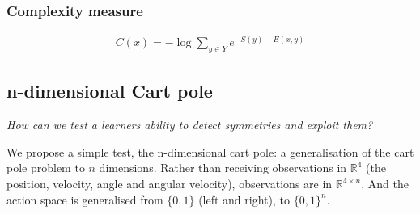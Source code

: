 \subsubsection{Complexity measure}

\begin{align*}
C(x) = -\log \sum_{y\in Y} e^{-S(y) - E(x, y)}
\end{align*}



%
%
%
%
%
%

\subsection{n-dimensional Cart pole}\label{action-space-experiments}

\begin{displayquote}
  \textit{How can we test a learners ability to detect symmetries and exploit them?}
\end{displayquote}

We propose a simple test, the n-dimensional cart pole: a generalisation of the
cart pole problem to $n$ dimensions. Rather than receiving observations in
$\mathbb{R}^4$ (the position, velocity, angle and angular velocity), observations are
in $\mathbb{R}^{4\times n}$. And the action space is generalised from $\{0,1\}$ (left and right),
to $\{0,1\}^{n}$.

